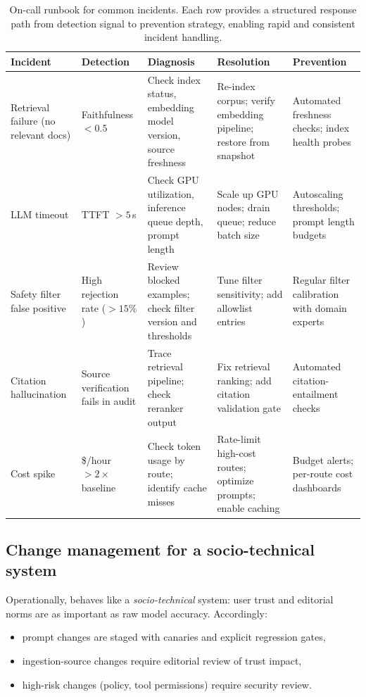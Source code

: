 \begin{table}[t]
\centering
\small
\caption{On-call runbook for common \ishtar{} incidents. Each row provides a structured response path from detection signal to prevention strategy, enabling rapid and consistent incident handling.}
\label{tab:ch12_runbook}
\setlength{\tabcolsep}{4pt}
\renewcommand{\arraystretch}{1.3}
\begin{tabularx}{\linewidth}{@{}>{\raggedright\arraybackslash}p{20mm}>{\raggedright\arraybackslash}p{20mm}>{\raggedright\arraybackslash}X>{\raggedright\arraybackslash}X>{\raggedright\arraybackslash}p{22mm}@{}}
\toprule
\rowcolor{gray!15}
\textbf{Incident} & \textbf{Detection} & \textbf{Diagnosis} & \textbf{Resolution} & \textbf{Prevention} \\
\midrule
Retrieval failure (no relevant docs) & Faithfulness $< 0.5$ & Check index status, embedding model version, source freshness & Re-index corpus; verify embedding pipeline; restore from snapshot & Automated freshness checks; index health probes \\
LLM timeout & TTFT $> 5$\,s & Check GPU utilization, inference queue depth, prompt length & Scale up GPU nodes; drain queue; reduce batch size & Autoscaling thresholds; prompt length budgets \\
Safety filter false positive & High rejection rate ($>15\%$) & Review blocked examples; check filter version and thresholds & Tune filter sensitivity; add allowlist entries & Regular filter calibration with domain experts \\
Citation hallucination & Source verification fails in audit & Trace retrieval pipeline; check reranker output & Fix retrieval ranking; add citation validation gate & Automated citation-entailment checks \\
Cost spike & \$/hour $> 2\times$ baseline & Check token usage by route; identify cache misses & Rate-limit high-cost routes; optimize prompts; enable caching & Budget alerts; per-route cost dashboards \\
\bottomrule
\end{tabularx}
\end{table}

\subsection{Change management for a socio-technical system}
\label{sec:ishtar-change-mgmt}

Operationally, \ishtar{} behaves like a \emph{socio-technical} system: user trust and editorial norms are as important as raw model accuracy.
Accordingly:
\begin{itemize}
    \item prompt changes are staged with canaries and explicit regression gates,
    \item ingestion-source changes require editorial review of trust impact,
    \item high-risk changes (policy, tool permissions) require security review.
\end{itemize}


